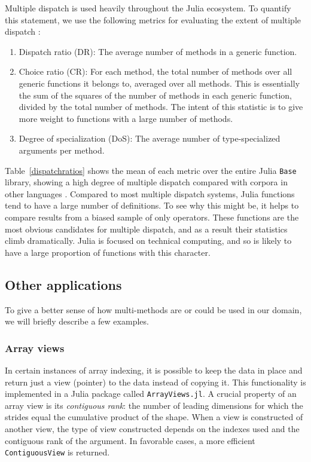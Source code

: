 \documentclass{sigplanconf}
\newcommand{\code}[1]{\texttt{#1}}
\begin{document}
Multiple dispatch is used heavily throughout the Julia ecosystem. To quantify
this statement, we use the following metrics for evaluating the extent of 
multiple dispatch \cite{Muschevici:2008}:

\begin{enumerate}
\item Dispatch ratio (DR): The average number of methods in a generic function.
\item Choice ratio (CR): For each method, the total number of methods over all
generic functions it belongs to, averaged over all methods. This is essentially
the sum of the squares of the number of methods in each generic function, divided
by the total number of methods. The intent of this statistic is to give more weight
to functions with a large number of methods.
\item Degree of specialization (DoS): The average number of type-specialized
arguments per method.
\end{enumerate}

Table~\ref{dispatchratios} shows the mean of each metric over the entire Julia
\code{Base} library, showing a high degree of multiple dispatch compared with
corpora in other languages \cite{Muschevici:2008}.
Compared to most multiple dispatch systems, Julia functions tend to have a large
number of definitions. To see why this might be, it helps to compare results
from a biased sample of only operators. These functions are the most obvious
candidates for multiple dispatch, and as a result their statistics climb
dramatically. Julia is focused on technical computing, and so is likely to
have a large proportion of functions with this character.

\subsection{Other applications}

To give a better sense of how multi-methods
are or could be used in our domain, we will briefly describe a few examples.

\subsubsection{Array views}

In certain instances of array indexing, it is
possible to keep the data in place and return just a view (pointer) to the
data instead of copying it. This functionality is implemented in a Julia
package called \code{ArrayViews.jl}\cite{Lin:2014av}. A crucial property
of an array view is its \emph{contiguous rank}: the number of leading
dimensions for which the strides equal the cumulative product of the shape.
When a view is constructed of another view, the type of view constructed
depends on the indexes used and the contiguous rank of the argument. In
favorable cases, a more efficient \code{ContiguousView} is returned.
\end{document}
